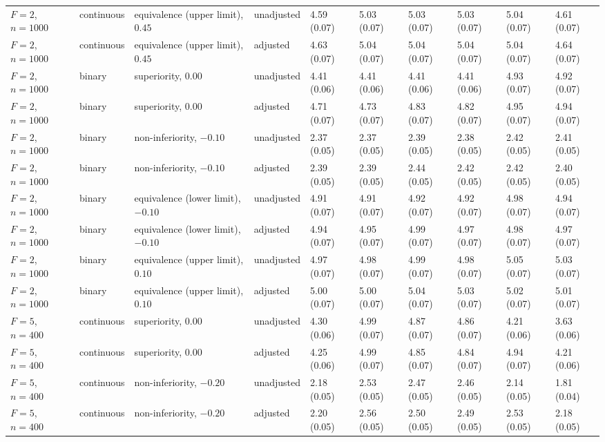 \begin{landscape}
\begin{singlespace}
\begin{longtable}{@{}llllllllll@{}}
$F=2$, $n=1000$ & continuous & equivalence (upper limit), $0.45$ & unadjusted & 4.59 (0.07) & 5.03 (0.07) & 5.03 (0.07) & 5.03 (0.07) & 5.04 (0.07) & 4.61 (0.07)\\
$F=2$, $n=1000$ & continuous & equivalence (upper limit), $0.45$ & adjusted & 4.63 (0.07) & 5.04 (0.07) & 5.04 (0.07) & 5.04 (0.07) & 5.04 (0.07) & 4.64 (0.07)\\
$F=2$, $n=1000$ & binary & superiority, $0.00$ & unadjusted & 4.41 (0.06) & 4.41 (0.06) & 4.41 (0.06) & 4.41 (0.06) & 4.93 (0.07) & 4.92 (0.07)\\
$F=2$, $n=1000$ & binary & superiority, $0.00$ & adjusted & 4.71 (0.07) & 4.73 (0.07) & 4.83 (0.07) & 4.82 (0.07) & 4.95 (0.07) & 4.94 (0.07)\\
$F=2$, $n=1000$ & binary & non-inferiority, $-0.10$ & unadjusted & 2.37 (0.05) & 2.37 (0.05) & 2.39 (0.05) & 2.38 (0.05) & 2.42 (0.05) & 2.41 (0.05)\\
$F=2$, $n=1000$ & binary & non-inferiority, $-0.10$ & adjusted & 2.39 (0.05) & 2.39 (0.05) & 2.44 (0.05) & 2.42 (0.05) & 2.42 (0.05) & 2.40 (0.05)\\
$F=2$, $n=1000$ & binary & equivalence (lower limit), $-0.10$ & unadjusted & 4.91 (0.07) & 4.91 (0.07) & 4.92 (0.07) & 4.92 (0.07) & 4.98 (0.07) & 4.94 (0.07)\\
$F=2$, $n=1000$ & binary & equivalence (lower limit), $-0.10$ & adjusted & 4.94 (0.07) & 4.95 (0.07) & 4.99 (0.07) & 4.97 (0.07) & 4.98 (0.07) & 4.97 (0.07)\\
$F=2$, $n=1000$ & binary & equivalence (upper limit), $0.10$ & unadjusted & 4.97 (0.07) & 4.98 (0.07) & 4.99 (0.07) & 4.98 (0.07) & 5.05 (0.07) & 5.03 (0.07)\\
$F=2$, $n=1000$ & binary & equivalence (upper limit), $0.10$ & adjusted & 5.00 (0.07) & 5.00 (0.07) & 5.04 (0.07) & 5.03 (0.07) & 5.02 (0.07) & 5.01 (0.07)\\
$F=5$, $n=400$ & continuous & superiority, $0.00$ & unadjusted & 4.30 (0.06) & 4.99 (0.07) & 4.87 (0.07) & 4.86 (0.07) & 4.21 (0.06) & 3.63 (0.06)\\
$F=5$, $n=400$ & continuous & superiority, $0.00$ & adjusted & 4.25 (0.06) & 4.99 (0.07) & 4.85 (0.07) & 4.84 (0.07) & 4.94 (0.07) & 4.21 (0.06)\\
$F=5$, $n=400$ & continuous & non-inferiority, $-0.20$ & unadjusted & 2.18 (0.05) & 2.53 (0.05) & 2.47 (0.05) & 2.46 (0.05) & 2.14 (0.05) & 1.81 (0.04)\\
$F=5$, $n=400$ & continuous & non-inferiority, $-0.20$ & adjusted & 2.20 (0.05) & 2.56 (0.05) & 2.50 (0.05) & 2.49 (0.05) & 2.53 (0.05) & 2.18 (0.05)\\

\end{longtable}
\end{singlespace}
\end{landscape}
